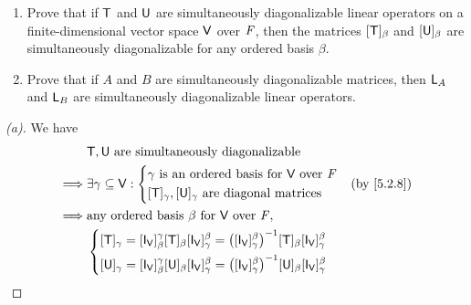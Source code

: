 \begin{ex}\label{ex:5.2.17}
  \begin{enumerate}
    \item Prove that if \(\mathsf{T}\) and \(\mathsf{U}\) are simultaneously diagonalizable linear operators on a finite-dimensional vector space \(\mathsf{V}\) over \(\mathit{F}\), then the matrices \([\mathsf{T}]_{\beta}\) and \([\mathsf{U}]_{\beta}\) are simultaneously diagonalizable for any ordered basis \(\beta\).
    \item Prove that if \(A\) and \(B\) are simultaneously diagonalizable matrices, then \(\mathsf{L}_A\) and \(\mathsf{L}_B\) are simultaneously diagonalizable linear operators.
  \end{enumerate}
\end{ex}

\begin{proof}[(a)]
  We have
  \begin{align*}
             & \T, \U \text{ are simultaneously diagonalizable}                                                                                                                                                                                                                \\
    \implies & \exists \gamma \subseteq \V : \begin{dcases}
                                               \gamma \text{ is an ordered basis for } \V \text{ over } \F \\
                                               [\T]_{\gamma}, [\U]_{\gamma} \text{ are diagonal matrices}
                                             \end{dcases}                                                                                                                                                                    &  & \text{(by \cref{5.2.8})}                     \\
    \implies & \text{any ordered basis } \beta \text{ for } \V \text{ over } \F,                                                                                                                                                                                               \\
             & \begin{dcases}
                 [\T]_{\gamma} = [\IT[\V]]_{\beta}^{\gamma} [\T]_{\beta} [\IT[\V]]_{\gamma}^{\beta} = \pa{[\IT[\V]]_{\gamma}^{\beta}}^{-1} [\T]_{\beta} [\IT[\V]]_{\gamma}^{\beta} \\
                 [\U]_{\gamma} = [\IT[\V]]_{\beta}^{\gamma} [\U]_{\beta} [\IT[\V]]_{\gamma}^{\beta} = \pa{[\IT[\V]]_{\gamma}^{\beta}}^{-1} [\U]_{\beta} [\IT[\V]]_{\gamma}^{\beta}

\end{dcases}
\end{align*}
\end{proof}
